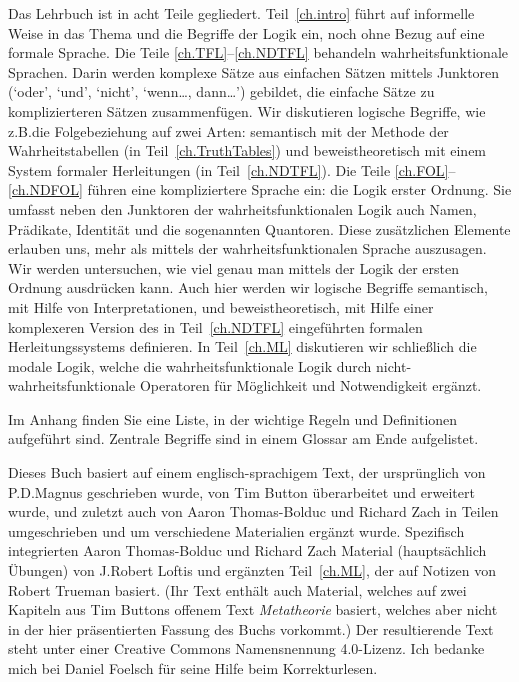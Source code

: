 Das Lehrbuch ist in acht Teile gegliedert. Teil~\ref{ch.intro} führt auf informelle Weise in das Thema und die Begriffe der Logik ein, noch ohne Bezug auf eine formale Sprache. Die Teile \ref{ch.TFL}--\ref{ch.NDTFL} behandeln wahrheitsfunktionale Sprachen. Darin werden komplexe Sätze aus einfachen Sätzen mittels Junktoren (`oder', `und', `nicht', `wenn\dots, dann\dots') gebildet, die einfache Sätze zu komplizierteren Sätzen zusammenfügen. Wir diskutieren logische Begriffe, wie z.B.\@ die Folgebeziehung auf zwei Arten: semantisch mit der Methode der Wahrheitstabellen (in Teil~\ref{ch.TruthTables}) und beweistheoretisch mit einem System formaler Herleitungen (in Teil~\ref{ch.NDTFL}). Die Teile \ref{ch.FOL}--\ref{ch.NDFOL} führen eine kompliziertere Sprache ein: die Logik erster Ordnung. Sie umfasst neben den Junktoren der wahrheitsfunktionalen Logik auch Namen, Prädikate, Identität und die sogenannten Quantoren. Diese zusätzlichen Elemente erlauben uns, mehr als mittels der wahrheitsfunktionalen Sprache auszusagen. Wir werden untersuchen, wie viel genau man mittels der Logik der ersten Ordnung ausdrücken kann. Auch hier werden wir logische Begriffe semantisch, mit Hilfe von Interpretationen, und beweistheoretisch, mit Hilfe einer komplexeren Version des in Teil~\ref{ch.NDTFL} eingeführten formalen Herleitungssystems definieren. In Teil~\ref{ch.ML} diskutieren wir schlie{\ss}lich die modale Logik, welche die wahrheitsfunktionale Logik durch nicht-wahrheitsfunktionale Operatoren für Möglichkeit und Notwendigkeit ergänzt. 

Im Anhang finden Sie eine Liste, in der wichtige Regeln und Definitionen aufgeführt sind. Zentrale Begriffe sind in einem Glossar am Ende aufgelistet.

Dieses Buch basiert auf einem englisch-sprachigem Text, der ursprünglich von P.D.\@ Magnus geschrieben wurde, von Tim Button überarbeitet und erweitert wurde, und zuletzt auch von Aaron Thomas-Bolduc und Richard Zach in Teilen umgeschrieben und um verschiedene Materialien ergänzt wurde. Spezifisch integrierten Aaron Thomas-Bolduc und Richard Zach Material (hauptsächlich Übungen) von J.\@ Robert Loftis und ergänzten Teil~\ref{ch.ML}, der auf Notizen von Robert Trueman basiert. (Ihr Text enthält auch Material, welches auf zwei Kapiteln aus Tim Buttons offenem Text \emph{Metatheorie} basiert, welches aber nicht in der hier präsentierten Fassung des Buchs vorkommt.) Der resultierende Text steht unter einer Creative Commons Namensnennung 4.0-Lizenz. Ich bedanke mich bei Daniel Foelsch für seine Hilfe beim Korrekturlesen.
